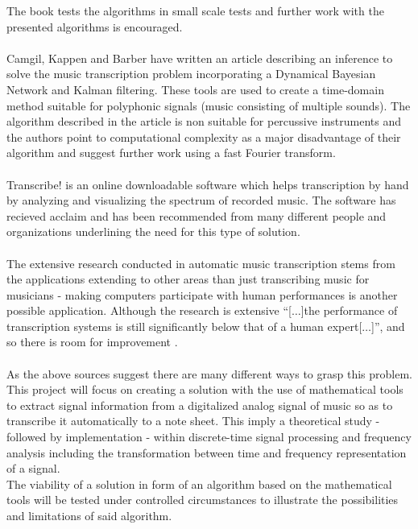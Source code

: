 The book tests the algorithms in small scale tests and further work with the presented algorithms is encouraged.
\\\\
Camgil, Kappen and Barber have written an article \cite{sol2} describing an inference to solve the music transcription problem incorporating a Dynamical Bayesian Network and Kalman filtering. These tools are used to create a time-domain method suitable for polyphonic signals (music consisting of multiple sounds). The algorithm described in the article is non suitable for percussive instruments and the authors point to computational complexity as a major disadvantage of their algorithm and suggest further work using a fast Fourier transform.
\\\\
Transcribe! \cite{transcribe!} is an online downloadable software which helps transcription by hand by analyzing and visualizing the spectrum of recorded music. The software has recieved acclaim and has been recommended from many different people and organizations underlining the need for this type of solution.
\\\\
The extensive research conducted in automatic music transcription stems from the applications extending to other areas than just transcribing music for musicians - making computers participate with human performances is another possible application. Although the research is extensive ``[$\ldots$]the performance of transcription systems is still significantly below that of a human expert[$\ldots$]'', and so there is room for improvement \cite{future}.
\\\\
As the above sources suggest there are many different ways to grasp this problem.\\
This project will focus on creating a solution with the use of mathematical tools to extract signal information from a digitalized analog signal of music so as to transcribe it automatically to a note sheet.  
This imply a theoretical study - followed by implementation - within discrete-time signal processing and frequency analysis including the transformation between time and frequency representation of a signal.\\    
The viability of a solution in form of an algorithm based on the mathematical tools will be tested under controlled circumstances to illustrate the possibilities and limitations of said algorithm. 

